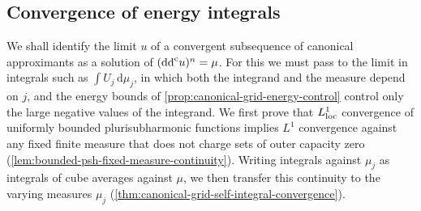 \subsection{Convergence of energy integrals}
\label{sec:canonical-grid-energy-convergence}
We shall identify the limit $u$ of a convergent subsequence of canonical approximants as a solution of $(\mathrm{dd}^{\mathrm{c}} u)^n=\mu$. For this we must pass to the limit in integrals such as $\int U_j\,\mathrm d\mu_j$, in which both the integrand and the measure depend on $j$, and the energy bounds of \cref{prop:canonical-grid-energy-control} control only the large negative values of the integrand. We first prove that $L^1_{\mathrm{loc}}$ convergence of uniformly bounded plurisubharmonic functions implies $L^1$ convergence against any fixed finite measure that does not charge sets of outer capacity zero (\cref{lem:bounded-psh-fixed-measure-continuity}). Writing integrals against $\mu_j$ as integrals of cube averages against $\mu$, we then transfer this continuity to the varying measures $\mu_j$ (\cref{thm:canonical-grid-self-integral-convergence}).

